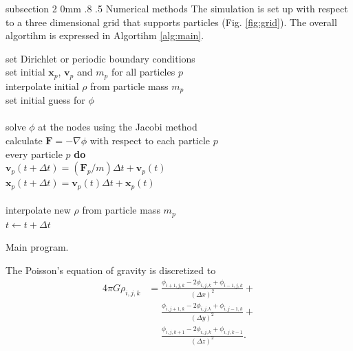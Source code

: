 \documentclass[notitlepage, 12pt]{article}
\makeatletter
\renewcommand{\subsection}{\@startsection    %
        {subsection}
        {2}
        {0mm}
        {.8\baselineskip}
        {.5\baselineskip}
        {\bfseries\normalsize}}
\makeatother
\begin{document}
\subsection{Numerical methods}\label{ssec:numerical}
The simulation is set up with respect to a three dimensional grid that supports particles (Fig. \ref{fig:grid}).
The overall algortihm is expressed in Algortihm \ref{alg:main}.
\begin{algorithm}[H]
\hspace{0.1\textwidth}\parbox{.8\textwidth}{
\-\hspace{0ex}set Dirichlet or periodic boundary conditions\\
\-\hspace{0ex}set initial $\mathbf{x}_p$, $\mathbf{v}_p$ and $m_p$ for all particles $p$\\
\-\hspace{0ex}interpolate initial $\rho$ from particle mass $m_p$\\
\-\hspace{0ex}set initial guess for $\phi$\\
\-\hspace{0ex}{\bf loop}\\
\-\hspace{4ex}solve $\phi$ at the nodes using the Jacobi method\\
\-\hspace{4ex}calculate $\mathbf{F}=-\nabla \phi$ with respect to each particle $p$\\
\-\hspace{4ex}{\bf for} every particle $p$ {\bf do}\\
\-\hspace{8ex}$\mathbf{v}_p(t+\Delta t) = (\mathbf{F}_p/m)\Delta t + \mathbf{v}_p(t)$\\
\-\hspace{8ex}$\mathbf{x}_p(t+\Delta t) = \mathbf{v}_p(t)\Delta t + \mathbf{x}_p(t)$\\
\-\hspace{4ex}{\bf end for}\\
\-\hspace{4ex}interpolate new $\rho$ from particle mass $m_p$\\
\-\hspace{4ex}$t\leftarrow t+\Delta t$\\
\-\hspace{0ex}{\bf end loop}}
\caption{Main program.}
\label{alg:main}
\end{algorithm}

The Poisson's equation of gravity is discretized to 
\begin{equation}
\begin{aligned}
4\pi G\rho_{i,j,k} &= \frac{\phi_{i+1,j,k}-2\phi_{i,j,k}+\phi_{i-1,j,k}}{(\Delta x)^2}+\\
& \phantom{{}={}} \frac{\phi_{i,j+1,k}-2\phi_{i,j,k}+\phi_{i,j-1,k}}{(\Delta y)^2}+\\
& \phantom{{}={}} \frac{\phi_{i,j,k+1}-2\phi_{i,j,k}+\phi_{i,j,k-1}}{(\Delta z)^2}.
\end{aligned}
\end{equation}
\end{document}
